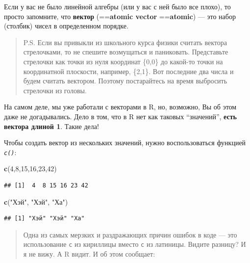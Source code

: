 \documentclass[]{book}
\newenvironment{Shaded}{\begin{snugshade}}{\end{snugshade}}
\newcommand{\DecValTok}[1]{\textcolor[rgb]{0.00,0.00,0.81}{#1}}
\newcommand{\KeywordTok}[1]{\textcolor[rgb]{0.13,0.29,0.53}{\textbf{#1}}}
\newcommand{\NormalTok}[1]{#1}
\newcommand{\StringTok}[1]{\textcolor[rgb]{0.31,0.60,0.02}{#1}}
\begin{document}
Если у вас не было линейной алгебры (или у вас с ней было все плохо), то просто запомните, что \textbf{вектор} (==\textbf{atomic vector} ==\textbf{atomic}) --- это набор (столбик) чисел в определенном порядке.

\begin{quote}
P.S. Если вы привыкли из школьного курса физики считать вектора стрелочками, то не спешите возмущаться и паниковать. Представьте стрелочки как точки из нуля координат \{0,0\} до какой-то точки на координатной плоскости, например, \{2,1\}. Вот последние два числа и будем считать вектором. Поэтому постарайтесь на время выбросить стрелочки из головы.
\end{quote}

На самом деле, мы уже работали с векторами в R, но, возможно, Вы об этом даже не догадывались. Дело в том, что в R нет как таковых ``значений'', \textbf{есть вектора длиной 1}. Такие дела!

Чтобы создать вектор из нескольких значений, нужно воспользоваться функцией \emph{\texttt{c()}}:

\begin{Shaded}
\begin{Highlighting}[]
\KeywordTok{c}\NormalTok{(}\DecValTok{4}\NormalTok{,}\DecValTok{8}\NormalTok{,}\DecValTok{15}\NormalTok{,}\DecValTok{16}\NormalTok{,}\DecValTok{23}\NormalTok{,}\DecValTok{42}\NormalTok{)}
\end{Highlighting}
\end{Shaded}

\begin{verbatim}
## [1]  4  8 15 16 23 42
\end{verbatim}

\begin{Shaded}
\begin{Highlighting}[]
\KeywordTok{c}\NormalTok{(}\StringTok{"Хэй"}\NormalTok{, }\StringTok{"Хэй"}\NormalTok{, }\StringTok{"Ха"}\NormalTok{)}
\end{Highlighting}
\end{Shaded}

\begin{verbatim}
## [1] "Хэй" "Хэй" "Ха"
\end{verbatim}

\begin{quote}
Одна из самых мерзких и раздражающих причин ошибок в коде --- это использование \texttt{с} из кириллицы вместо \texttt{c} из латиницы. Видите разницу? И я не вижу. А R видит. И об этом сообщает:
\end{quote}
\end{document}
